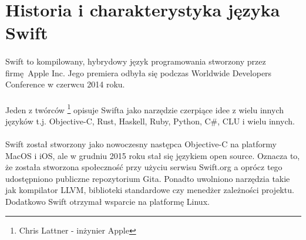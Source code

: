 \documentclass[11pt,twoside,a4paper]{report}
\begin{document}
\section{Historia i charakterystyka języka Swift}
\paragraph{}Swift to kompilowany, hybrydowy język programowania stworzony przez firmę Apple Inc. Jego premiera odbyła się podczas Worldwide Developers Conference w czerwcu 2014 roku.\cite{swiftHistory} 
\paragraph{}Jeden z twórców \footnote{Chris Lattner - inżynier Apple} opisuje Swifta jako narzędzie czerpiące idee z wielu innych języków t.j. Objective-C, Rust, Haskell, Ruby, Python, C\#, CLU i wielu innych. 
\paragraph{}Swift został stworzony jako nowoczesny następca Objective-C na platformy MacOS i iOS, ale w grudniu 2015 roku stał się językiem open source. Oznacza to, że została stworzona społeczność przy użyciu serwisu Swift.org a oprócz tego udostępniono publiczne repozytorium Gita. Ponadto uwolniono narzędzia takie jak kompilator LLVM, biblioteki standardowe czy menedżer zależności projektu. Dodatkowo Swift otrzymał wsparcie na platformę Linux.\cite{swiftOpensource}
\end{document}
